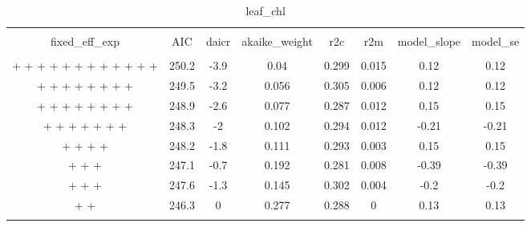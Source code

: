 
\begin{table}[!htbp] \centering 
  \caption{leaf_chl} 
  \label{leaf_chl} 
\begin{tabular}{@{\extracolsep{5pt}} cccccccc} 
\\[-1.8ex]\hline 
\hline \\[-1.8ex] 
fixed\_eff\_exp & AIC & daicr & akaike\_weight & r2c & r2m & model\_slope & model\_se \\ 
\hline \\[-1.8ex] 
 +  +  +  +  +  +  +  +  +  +  +  +  & 250.2 & -3.9 & 0.04 & 0.299 & 0.015 & 0.12 & 0.12 \\ 
 +  +  +  +  +  +  +  +  & 249.5 & -3.2 & 0.056 & 0.305 & 0.006 & 0.12 & 0.12 \\ 
 +  +  +  +  +  +  +  +  & 248.9 & -2.6 & 0.077 & 0.287 & 0.012 & 0.15 & 0.15 \\ 
 +  +  +  +  +  +  +  & 248.3 & -2 & 0.102 & 0.294 & 0.012 & -0.21 & -0.21 \\ 
 +  +  +  +  & 248.2 & -1.8 & 0.111 & 0.293 & 0.003 & 0.15 & 0.15 \\ 
 +  +  +  & 247.1 & -0.7 & 0.192 & 0.281 & 0.008 & -0.39 & -0.39 \\ 
 +  +  +  & 247.6 & -1.3 & 0.145 & 0.302 & 0.004 & -0.2 & -0.2 \\ 
 +  +  & 246.3 & 0 & 0.277 & 0.288 & 0 & 0.13 & 0.13 \\ 
\hline \\[-1.8ex] 
\end{tabular} 
\end{table} 
